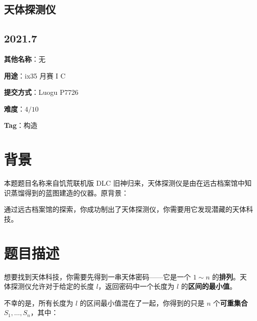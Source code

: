 \documentclass[a4paper,10pt]{article}
\begin{document}
\vspace*{\fill}
\begin{center}

\section{天体探测仪}

\subsection*{2021.7}

\vspace{10pt}

\textbf{其他名称}：无

\vspace{10pt}

\textbf{用途}：ix35 月赛 I C

\vspace{10pt}

\textbf{提交方式}：Luogu P7726

\vspace{10pt}

\textbf{难度}：$4/10$

\vspace{10pt}

\textbf{Tag}：构造

\end{center}
\vspace*{\fill}

\newpage

\section*{背景}

本题题目名称来自饥荒联机版 DLC 旧神归来，天体探测仪是由在远古档案馆中知识蒸馏得到的蓝图建造的仪器。原背景：

通过远古档案馆的探索，你成功制出了天体探测仪，你需要用它发现潜藏的天体科技。

\section*{题目描述}

想要找到天体科技，你需要先得到一串天体密码——它是一个 $1 \sim n$ 的\textbf{排列}。天体探测仪允许对于给定的长度 $l$，返回密码中一个长度为 $l$ 的\textbf{区间的最小值}。

不幸的是，所有长度为 $l$ 的区间最小值混在了一起，你得到的只是 $n$ 个\textbf{可重集合} $S_1,\ldots,S_n$，其中：
\end{document}
